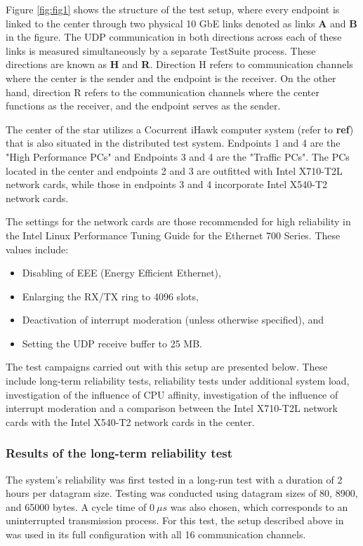 \documentclass[11pt]{article}
\begin{document}
Figure \ref{fig:fig1} shows the structure of the test setup, where every endpoint is linked to the center through two physical 10 GbE links denoted as links \textbf{A} and \textbf{B} in the figure. The UDP communication in both directions across each of these links is measured simultaneously by a separate TestSuite process. These directions are known as \textbf{H} and \textbf{R}. Direction H refers to communication channels where the center is the sender and the endpoint is the receiver. On the other hand, direction R refers to the communication channels where the center functions as the receiver, and the endpoint serves as the sender.

The center of the star utilizes a Cocurrent iHawk computer system (refer to \textbf{ref}) that is also situated in the distributed test system. Endpoints 1 and 4 are the "High Performance PCs" and Endpoints 3 and 4 are the "Traffic PCs". The PCs located in the center and endpoints 2 and 3 are outfitted with Intel X710-T2L network cards, while those in endpoints 3 and 4 incorporate Intel X540-T2 network cards.

The settings for the network cards are those recommended for high reliability in the Intel Linux Performance Tuning Guide for the Ethernet 700 Series. These values include:

\begin{itemize}

\item Disabling of EEE (Energy Efficient Ethernet),
\item Enlarging the RX/TX ring to 4096 slots,
\item Deactivation of interrupt moderation (unless otherwise specified), and
\item Setting the UDP receive buffer to 25 MB.
\end{itemize}


The test campaigns carried out with this setup are presented below. These include long-term reliability tests, reliability tests under additional system load, investigation of the influence of CPU affinity, investigation of the influence of interrupt moderation and a comparison between the Intel X710-T2L network cards with the Intel X540-T2 network cards in the center.


\subsubsection{Results of the long-term reliability test}
The system's reliability was first tested in a long-run test with a duration of 2 hours per datagram size. Testing was conducted using datagram sizes of 80, 8900, and 65000 bytes. A cycle time of \( 0\ \mu s \) was also chosen, which corresponds to an uninterrupted transmission process. For this test, the setup described above in was used in its full configuration with all 16 communication channels.
\end{document}
